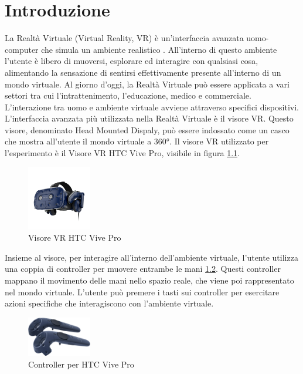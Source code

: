 \documentclass[target=bach,aauheader=]{thud}
\begin{document}
\chapter{Introduzione} %
\label{intro}
La Realtà Virtuale (Virtual Reality, VR) è un'interfaccia avanzata uomo-computer che simula un ambiente realistico \cite{Zheng}.
All'interno di questo ambiente l'utente è libero di muoversi, esplorare ed interagire con qualsiasi cosa, alimentando la sensazione di sentirsi effettivamente presente all'interno di un mondo virtuale.
Al giorno d'oggi, la Realtà Virtuale può essere applicata a vari settori tra cui l'intrattenimento, l'educazione, medico e commerciale. \\

L'interazione tra uomo e ambiente virtuale avviene attraverso specifici dispositivi.
L'interfaccia avanzata più utilizzata nella Realtà Virtuale è il visore VR. 
Questo visore, denominato Head Mounted Dispaly, può essere indossato come un casco che mostra all'utente il mondo virtuale a 360°.
Il visore VR utilizzato per l'esperimento è il Visore VR HTC Vive Pro, visibile in figura \ref{fig:vive_pro}.

\begin{figure}[h]
    \centering
    \includegraphics[width=0.25\textwidth]{vive_pro}
    \caption{Visore VR HTC Vive Pro}
    \label{fig:vive_pro}
\end{figure}

Insieme al visore, per interagire all'interno dell'ambiente virtuale, l'utente utilizza una coppia di controller per muovere entrambe le mani \ref{fig:vive_contr}.
Questi controller mappano il movimento delle mani nello spazio reale, che viene poi rappresentato nel mondo virtuale. 
L'utente può premere i tasti sui controller per esercitare azioni specifiche che interagiscono con l'ambiente virtuale. \\

\begin{figure}[h]
    \centering
    \includegraphics[width=0.25\textwidth]{vive_contr}
    \caption{Controller per HTC Vive Pro}
    \label{fig:vive_contr}
\end{figure}
\end{document}
